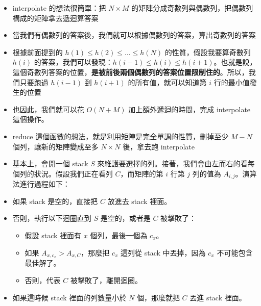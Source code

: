 \documentclass[standalone]{beamer}
\begin{document}
\begin{frame}{}
  \begin{itemize}
    \item interpolate 的想法很簡單：把 $N \times M$ 的矩陣分成奇數列與偶數列，把偶數列構成的矩陣拿去遞迴算答案
    \item 當我們有偶數列的答案後，我們就可以根據偶數列的答案，算出奇數列的答案
    \item 根據前面提到的 $h(1) \leq h(2) \leq \dots \leq h(N)$ 的性質，假設我要算奇數列 $h(i)$ 的答案，我們可以發現：$h(i - 1) \leq h(i) \leq h(i + 1)$。也就是說，這個奇數列答案的位置，\textbf{是被前後兩個偶數列的答案位置限制住的}。所以，我們只要跑過 $h(i - 1)$ 到 $h(i + 1)$ 的所有值，就可以知道第 $i$ 行的最小值發生的位置
    \item 也因此，我們就可以花 $O(N + M)$ 加上額外遞迴的時間，完成 interpolate 這個操作。
  \end{itemize}
\end{frame}

\begin{frame}{}
  \begin{itemize}
  \item reduce 這個函數的想法，就是利用矩陣是完全單調的性質，刪掉至少 $M - N$ 個列，讓新的矩陣變成至多 $N \times N$ 後，拿去跑 interpolate
  \item 基本上，會開一個 stack $S$ 來維護要選擇的列。接著，我們會由左而右的看每個列的狀況。假設我們正在看列 $C$，而矩陣的第 $i$ 行第 $j$ 列的值為 $A_{i, j}$。演算法進行過程如下：
  \item 如果 stack 是空的，直接把 $C$ 放進去 stack 裡面。
  \item 否則，執行以下迴圈直到 $S$ 是空的，或者是 $C$ 被擊敗了：
  \begin{itemize}
    \item 假設 stack 裡面有 $x$ 個列，最後一個為 $c_x$。
    \item 如果 $A_{x, c_x} > A_{x, C}$，那麼把 $c_x$ 這列從 stack 中丟掉，因為 $c_x$ 不可能包含最佳解了。
    \item 否則，代表 $C$ 被擊敗了，離開迴圈。
  \end{itemize}
  \item 如果這時候 stack 裡面的列數量小於 $N$ 個，那麼就把 $C$ 丟進 stack 裡面。
\end{itemize}
\end{frame}
\end{document}
